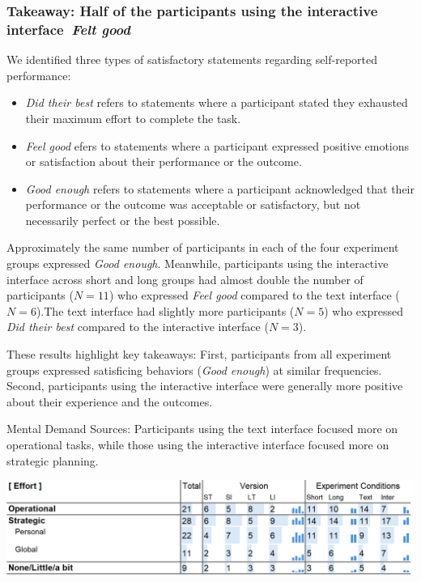 \subsubsection{Takeaway: Half of the participants using the interactive interface~\textit{Felt good}}
We identified three types of satisfactory statements regarding self-reported performance:
\begin{itemize}
    \item \textit{Did their best} refers to statements where a participant stated they exhausted their maximum effort to complete the task.
    \item \textit{Feel good} efers to statements where a participant expressed positive emotions or satisfaction about their performance or the outcome.
    \item \textit{Good enough} refers to statements where a participant acknowledged that their performance or the outcome was acceptable or satisfactory, but not necessarily perfect or the best possible.
\end{itemize}

Approximately the same number of participants in each of the four experiment groups expressed \textit{Good enough}. Meanwhile, participants using the interactive interface across short and long groups had almost double the number of participants ($N=11$) who expressed \textit{Feel good} compared to the text interface ($N=6$).The text interface had slightly more participants ($N=5$) who expressed \textit{Did their best} compared to the interactive interface ($N=3$).

These results highlight key takeaways: First, participants from all experiment groups expressed satisficing behaviors (\textit{Good enough}) at similar frequencies. Second, participants using the interactive interface were generally more positive about their experience and the outcomes.



\begin{table}[h]
    \caption{Mental Demand Sources: Participants using the text interface focused more on operational tasks, while those using the interactive interface focused more on strategic planning.}
    \label{tbl:physical}
    \includegraphics[width=\linewidth]{content/image/cog/effort_table.png}
\end{table}

